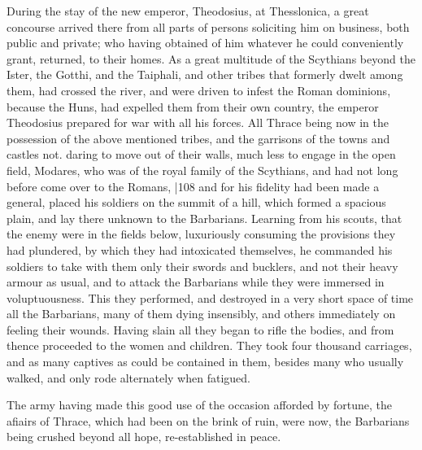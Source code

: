 During the stay of the new emperor, Theodosius, at Thesslonica, a great concourse arrived there from all parts of persons soliciting him on business, both public and private; who having obtained of him whatever he could conveniently grant, returned, to their homes. As a great multitude of the Scythians beyond the Ister, the Gotthi, and the Taiphali, and other tribes that formerly dwelt among them, had crossed the river, and were driven to infest the Roman dominions, because the Huns, had expelled them from their own country, the emperor Theodosius prepared for war with all his forces. All Thrace being now in the possession of the above mentioned tribes, and the garrisons of the towns and castles not. daring to move out of their walls, much less to engage in the open field, Modares, who was of the royal family of the Scythians, and had not long before come over to the Romans,
|108
and for his fidelity had been made a general, placed his soldiers on the summit of a hill, which formed a spacious plain, and lay there unknown to the Barbarians. Learning from his scouts, that the enemy were in the fields below, luxuriously consuming the provisions they had plundered, by which they had intoxicated themselves, he commanded his soldiers to take with them only their swords and bucklers, and not their heavy armour as usual, and to attack the Barbarians while they were immersed in voluptuousness. This they performed, and destroyed in a very short space of time all the Barbarians, many of them dying insensibly, and others immediately on feeling their wounds. Having slain all they began to rifle the bodies, and from thence proceeded to the women and children. They took four thousand carriages, and as many captives as could be contained in them, besides many who usually walked, and only rode alternately when fatigued.

The army having made this good use of the occasion afforded by fortune, the afiairs of Thrace, which had been on the brink of ruin, were now, the Barbarians being crushed beyond all hope, re-established in peace.

